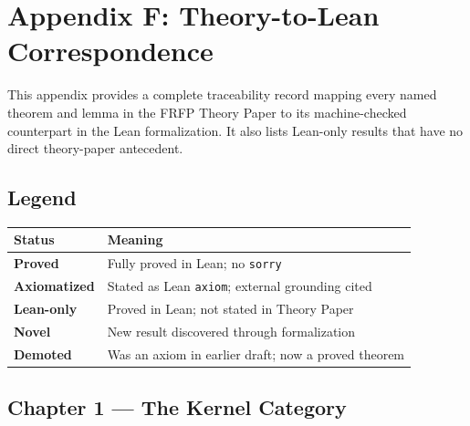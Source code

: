 \section{Appendix F: Theory-to-Lean Correspondence}
\label{app:theory_lean_map}

This appendix provides a complete traceability record mapping every named theorem
and lemma in the FRFP Theory Paper to its machine-checked counterpart in the Lean
formalization.  It also lists Lean-only results that have no direct theory-paper
antecedent.

\subsection*{Legend}

\begin{center}
\begin{tabular}{ll}
\toprule
Status & Meaning \\
\midrule
\textbf{Proved} & Fully proved in Lean; no \texttt{sorry} \\
\textbf{Axiomatized} & Stated as Lean \texttt{axiom}; external grounding cited \\
\textbf{Lean-only} & Proved in Lean; not stated in Theory Paper \\
\textbf{Novel} & New result discovered through formalization \\
\textbf{Demoted} & Was an axiom in earlier draft; now a proved theorem \\
\bottomrule
\end{tabular}
\end{center}

\subsection*{Chapter 1 — The Kernel Category}


